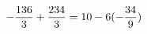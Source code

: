 \documentclass[preview]{standalone}
\begin{document}
\begin{align*}
\special{dvisvgm:raw <g id='unique000'>}- \frac{136}{3} + \frac{234}{3} = 10 - 6 (- \frac{34}{9})\special{dvisvgm:raw </g>}
\end{align*}
\end{document}
